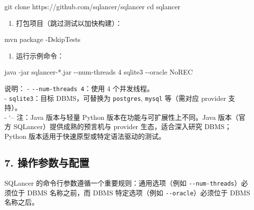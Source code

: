 \documentclass[
]{article}
\newenvironment{Shaded}{}{}
\newcommand{\AttributeTok}[1]{\textcolor[rgb]{0.49,0.56,0.16}{#1}}
\newcommand{\BuiltInTok}[1]{\textcolor[rgb]{0.00,0.50,0.00}{#1}}
\newcommand{\ExtensionTok}[1]{#1}
\newcommand{\FunctionTok}[1]{\textcolor[rgb]{0.02,0.16,0.49}{#1}}
\newcommand{\NormalTok}[1]{#1}
\newcommand{\PreprocessorTok}[1]{\textcolor[rgb]{0.74,0.48,0.00}{#1}}
\providecommand{\tightlist}{%
  \setlength{\itemsep}{0pt}\setlength{\parskip}{0pt}}
\begin{document}
\begin{Shaded}
\begin{Highlighting}[]
\FunctionTok{git}\NormalTok{ clone https://github.com/sqlancer/sqlancer}
\BuiltInTok{cd}\NormalTok{ sqlancer}
\end{Highlighting}
\end{Shaded}

\begin{enumerate}
\def\labelenumi{\arabic{enumi}.}
\setcounter{enumi}{1}
\tightlist
\item
  打包项目（跳过测试以加快构建）：
\end{enumerate}

\begin{Shaded}
\begin{Highlighting}[]
\ExtensionTok{mvn}\NormalTok{ package }\AttributeTok{{-}DskipTests}
\end{Highlighting}
\end{Shaded}

\begin{enumerate}
\def\labelenumi{\arabic{enumi}.}
\setcounter{enumi}{2}
\tightlist
\item
  运行示例命令：
\end{enumerate}

\begin{Shaded}
\begin{Highlighting}[]
\ExtensionTok{java} \AttributeTok{{-}jar}\NormalTok{ sqlancer{-}}\PreprocessorTok{*}\NormalTok{.jar }\AttributeTok{{-}{-}num{-}threads}\NormalTok{ 4 sqlite3 }\AttributeTok{{-}{-}oracle}\NormalTok{ NoREC}
\end{Highlighting}
\end{Shaded}

说明： - \texttt{-\/-num-threads\ 4}：使用 4 个并发线程。\\
- \texttt{sqlite3}：目标 DBMS，可替换为 \texttt{postgres},
\texttt{mysql} 等（需对应 provider 支持）。\\
- `-- 注：Java 版本与轻量 Python 版本在功能与可扩展性上不同。Java
版本（官方 SQLancer）提供成熟的预言机与 provider 生态，适合深入研究
DBMS；Python 版本适用于快速原型或特定语法驱动的测试。

\subsection{7.
操作参数与配置}\label{ux64cdux4f5cux53c2ux6570ux4e0eux914dux7f6e}

SQLancer 的命令行参数遵循一个重要规则：通用选项（例如
\texttt{-\/-num-threads}）必须位于 DBMS 名称之前，而 DBMS 特定选项（例如
\texttt{-\/-oracle}）必须位于 DBMS 名称之后。
\end{document}
